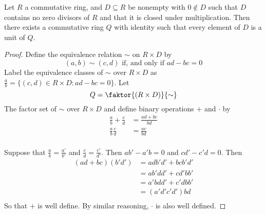 \begin{theorem}\label{theorem_5.7.2}
  Let $R$ a commutative ring, and  $D \subseteq R$ be nonempty with $0 \notin
  D$ such that $D$ contains no zero divisors of $R$ and that it is closed
  under multiplication. Then there exists a commutative ring $Q$ with identity
  such that  every element of  $D$ is a unit of $Q$.
\end{theorem}
\begin{proof}
  Define the equivalence relation $\sim$ on  $R \times D$ by
  \begin{equation*}
    (a,b) \sim (c,d) \text{ if, and only if } ad-bc=0
  \end{equation*}
  Label the equivalence classes of $\sim$ over $R \times D$ as
  $\frac{a}{b}=\{(c,d) \in R \times D : ad-bc=0\}$. Let
  \begin{equation*}
    Q=\faktor{(R \times D)}{\sim}
  \end{equation*}
  The factor set of $\sim$ over $R \times D$ and define binary operations $+$
  and  $\cdot$ by
  \begin{align*}
    \frac{a}{b}+\frac{c}{d}     &=  \frac{ad+bc}{bd}    \\
    \frac{a}{b}\frac{c}{d}     &=  \frac{ac}{bd}    \\
  \end{align*}

  Suppose that $\frac{a}{b}=\frac{a'}{b'}$ and $\frac{c}{d}=\frac{c'}{d'}$.
  Then $ab'-a'b=0$ and  $cd'-c'd=0$. Then
  \begin{align*}
    (ad+bc)(b'd')       &=  adb'd'+bcb'd'  \\
                        &=  ab'dd'+cd'bb'   \\
                        &=  a'bdd'+c'dbb'   \\
                        &=  (a'd'c'd')bd    \\
  \end{align*}
  So that $+$ is well define. By similar reasoning,  $\cdot$ is also well
  defined.


\end{proof}
